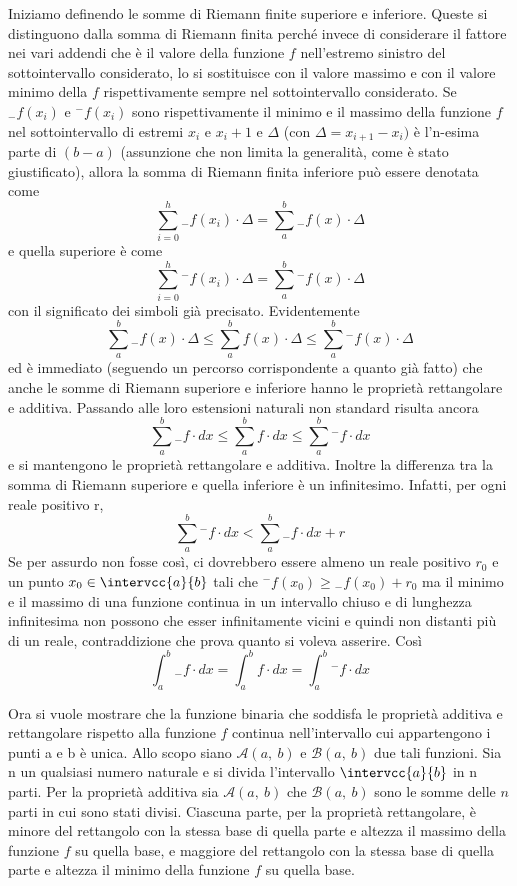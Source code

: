 Iniziamo definendo le somme di Riemann finite superiore e inferiore. Queste 
si distinguono dalla somma di Riemann finita perché invece di considerare il 
fattore nei vari addendi che è il valore della funzione \(f\) nell'estremo 
sinistro del sottointervallo considerato, lo si sostituisce con il valore 
massimo e con il valore minimo della \(f\) rispettivamente sempre nel 
sottointervallo considerato. Se \({}_{-}f(x_i)\) e \({}^{-}f(x_i)\) sono 
rispettivamente il minimo e il massimo della funzione \(f\) nel 
sottointervallo 
di estremi \(x_i\) e \(x_i+1\) 
e \(\Delta\) (con \(\Delta =x_{i+1} - x_i)\) 
è l'n-esima parte di \((b - a)\) 
(assunzione che non limita la generalità, come è stato giustificato), 
allora la somma di Riemann finita inferiore può essere denotata come 
\[\sum_{i=0}^h{}_{-}f(x_i)\cdot\Delta = \sum_a^b{}_{-} f(x) \cdot \Delta\] 
e quella superiore è come 
\[\sum_{i=0}^h {}^{-}f(x_i)\cdot\Delta = 
  \sum_a^b {}^{-}f(x) \cdot \Delta\] 
con il significato dei simboli già precisato.
Evidentemente 
\[\sum_a^b{}_{-}f(x) \cdot \Delta \le \sum_a^b f(x) \cdot \Delta \le 
\sum_a^b {}^{-}f(x) \cdot \Delta\] 
ed è immediato (seguendo un percorso corrispondente a quanto già fatto) che 
anche le somme di Riemann superiore e inferiore hanno le proprietà 
rettangolare 
e additiva. 
  Passando alle loro estensioni naturali non standard risulta ancora 
\[\sum_a^b {}_{-}f \cdot dx \le \sum_a^b f \cdot dx \le 
  \sum_a^b {}^{-}f \cdot dx\] 
e si mantengono le proprietà rettangolare e additiva. 
Inoltre la differenza tra la somma di Riemann superiore e quella inferiore è 
un infinitesimo. Infatti, per ogni reale positivo r, 
\[\sum_a^b {}^{-}f \cdot dx < \sum_a^b {}_{-}f \cdot dx +r\] 
Se per assurdo non fosse così, ci dovrebbero essere almeno un reale 
positivo \(r_0\) e un punto \(x_0 \in \intervcc{a}{b}\) tali che 
\({}^{-}f(x_0) \ge {}_{-}f(x_0)+r_0\) 
ma il minimo e il massimo di una funzione continua in un intervallo chiuso e 
di lunghezza infinitesima non possono che esser infinitamente vicini e quindi 
non distanti più di un reale, contraddizione che prova quanto si voleva 
asserire. Così 
\[\int_a^b {}_{-}f \cdot dx = \int_a^b f \cdot dx = 
  \int_a^b {}^{-}f \cdot dx\]
  
Ora si vuole mostrare che la funzione binaria che soddisfa le proprietà 
additiva e rettangolare rispetto alla funzione \(f\) continua nell'intervallo 
cui appartengono i punti a e b è unica.
Allo scopo siano \(\mathcal{A}(a,~b)\) e \(\mathcal{B}(a,~b)\) due tali 
funzioni. 
Sia n un qualsiasi numero naturale e si divida l'intervallo 
\(\intervcc{a}{b}\) in n parti. 
Per la proprietà 
additiva sia \(\mathcal{A}(a,~b)\) che \(\mathcal{B}(a,~b)\) sono le somme 
delle \(n\) 
parti in cui sono stati divisi. 
Ciascuna parte, per la proprietà rettangolare, è minore del 
rettangolo con la stessa base di quella parte e altezza il massimo della 
funzione \(f\) su quella base, e maggiore del rettangolo con la stessa base 
di 
quella parte e altezza il minimo della funzione \(f\) su quella base. 

